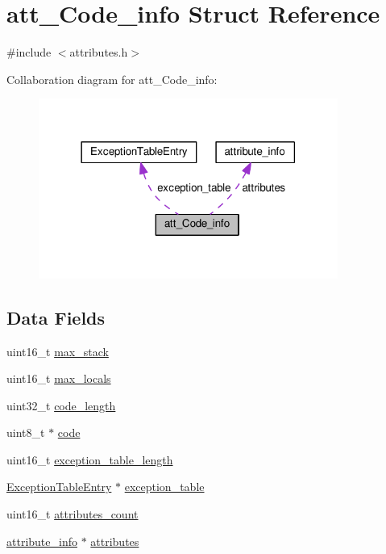 \hypertarget{structatt__Code__info}{}\section{att\+\_\+\+Code\+\_\+info Struct Reference}
\label{structatt__Code__info}


{\ttfamily \#include $<$attributes.\+h$>$}



Collaboration diagram for att\+\_\+\+Code\+\_\+info\+:\nopagebreak
\begin{figure}[H]
\begin{center}
\leavevmode
\includegraphics[width=278pt]{structatt__Code__info__coll__graph}
\end{center}
\end{figure}
\subsection*{Data Fields}
\begin{DoxyCompactItemize}
\item 
uint16\+\_\+t \hyperlink{structatt__Code__info_aa2d5de07b8832d1cd18a3e4779348fe3}{max\+\_\+stack}
\item 
uint16\+\_\+t \hyperlink{structatt__Code__info_acc9a5f7316ef5c5e051f88646bacf445}{max\+\_\+locals}
\item 
uint32\+\_\+t \hyperlink{structatt__Code__info_a24832826292dff47147e23f9d440bd2a}{code\+\_\+length}
\item 
uint8\+\_\+t $\ast$ \hyperlink{structatt__Code__info_a8fb8f2fa609ccf1786492efca32d3be9}{code}
\item 
uint16\+\_\+t \hyperlink{structatt__Code__info_aacd07775342d4f5ace7485e36e2e5e3b}{exception\+\_\+table\+\_\+length}
\item 
\hyperlink{structExceptionTableEntry}{Exception\+Table\+Entry} $\ast$ \hyperlink{structatt__Code__info_af5c5d84bb1f725dc949981cc752c45d2}{exception\+\_\+table}
\item 
uint16\+\_\+t \hyperlink{structatt__Code__info_a9bed6599acdfbf0b3391c827272a5502}{attributes\+\_\+count}
\item 
\hyperlink{structattribute__info}{attribute\+\_\+info} $\ast$ \hyperlink{structatt__Code__info_a09d52ef82f22bf27c4b5e3f2ab021f79}{attributes}
\end{DoxyCompactItemize}


